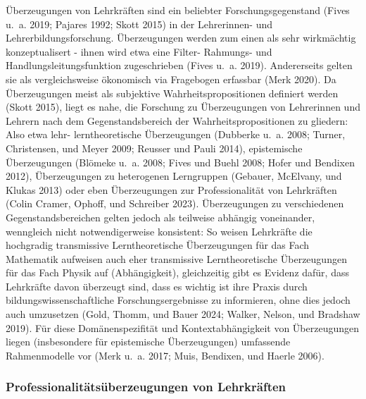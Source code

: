 \documentclass[
  letterpaper,
  DIV=11]{scrartcl}
\begin{document}
Überzeugungen von Lehrkräften sind ein beliebter Forschungsgegenstand
(Fives u.~a. 2019; Pajares 1992; Skott 2015) in der Lehrerinnen- und
Lehrerbildungsforschung. Überzeugungen werden zum einen als sehr
wirkmächtig konzeptualisert - ihnen wird etwa eine Filter- Rahmungs- und
Handlungsleitungsfunktion zugeschrieben (Fives u.~a. 2019). Andererseits
gelten sie als vergleichsweise ökonomisch via Fragebogen erfassbar (Merk
2020). Da Überzeugungen meist als subjektive Wahrheitspropositionen
definiert werden (Skott 2015), liegt es nahe, die Forschung zu
Überzeugungen von Lehrerinnen und Lehrern nach dem Gegenstandsbereich
der Wahrheitspropositionen zu gliedern: Also etwa lehr- lerntheoretische
Überzeugungen (Dubberke u.~a. 2008; Turner, Christensen, und Meyer 2009;
Reusser und Pauli 2014), epistemische Überzeugungen (Blömeke u.~a. 2008;
Fives und Buehl 2008; Hofer und Bendixen 2012), Überzeugungen zu
heterogenen Lerngruppen (Gebauer, McElvany, und Klukas 2013) oder eben
Überzeugungen zur Professionalität von Lehrkräften (Colin Cramer,
Ophoff, und Schreiber 2023). Überzeugungen zu verschiedenen
Gegenstandsbereichen gelten jedoch als teilweise abhängig voneinander,
wenngleich nicht notwendigerweise konsistent: So weisen Lehrkräfte die
hochgradig transmissive Lerntheoretische Überzeugungen für das Fach
Mathematik aufweisen auch eher transmissive Lerntheoretische
Überzeugungen für das Fach Physik auf (Abhängigkeit), gleichzeitig gibt
es Evidenz dafür, dass Lehrkräfte davon überzeugt sind, dass es wichtig
ist ihre Praxis durch bildungswissenschaftliche Forschungsergebnisse zu
informieren, ohne dies jedoch auch umzusetzen (Gold, Thomm, und Bauer
2024; Walker, Nelson, und Bradshaw 2019). Für diese Domänenspezifität
und Kontextabhängigkeit von Überzeugungen liegen (insbesondere für
epistemische Überzeugungen) umfassende Rahmenmodelle vor (Merk u.~a.
2017; Muis, Bendixen, und Haerle 2006).

\subsubsection{Professionalitätsüberzeugungen von
Lehrkräften}\label{professionalituxe4tsuxfcberzeugungen-von-lehrkruxe4ften}
\end{document}
